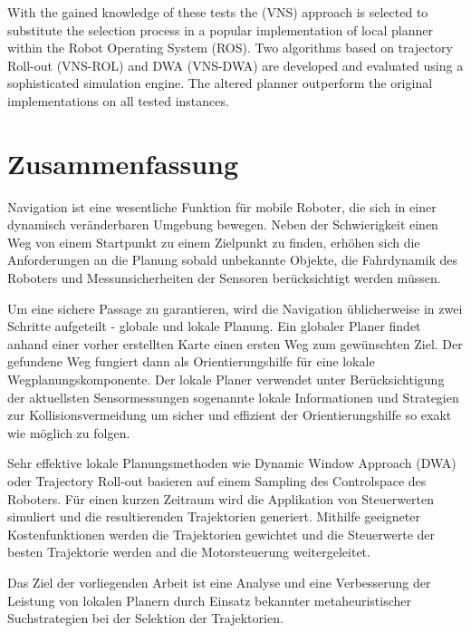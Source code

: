 With the gained knowledge of these tests the (VNS) approach is selected to substitute the selection process in a popular implementation of local planner within the Robot Operating System (ROS). 
Two algorithms based on trajectory Roll-out (VNS-ROL) and DWA (VNS-DWA) are developed and evaluated using a sophisticated simulation engine. 
The altered planner outperform the original implementations on all tested instances.
\vfill
\newpage

\chapter*{Zusammenfassung}
Navigation ist eine wesentliche Funktion f\"ur mobile Roboter, die sich in einer dynamisch ver\"anderbaren Umgebung bewegen. 
Neben der Schwierigkeit einen Weg von einem Startpunkt zu einem Zielpunkt zu finden, erh\"ohen sich die Anforderungen an die Planung sobald unbekannte Objekte, die Fahrdynamik des Roboters und Messunsicherheiten der Sensoren ber\"ucksichtigt werden m\"ussen. 

Um eine sichere Passage zu garantieren, wird die Navigation \"ublicherweise in zwei Schritte aufgeteilt - globale und lokale Planung. 
Ein globaler Planer findet anhand einer vorher erstellten Karte einen ersten Weg zum gew\"unschten Ziel. 
Der gefundene Weg fungiert dann als Orientierungshilfe f\"ur eine lokale Wegplanungskomponente. 
Der lokale Planer verwendet unter Ber\"ucksichtigung der aktuellsten Sensormessungen sogenannte lokale Informationen und Strategien zur Kollisionsvermeidung um sicher und effizient der Orientierungshilfe so exakt wie m\"oglich zu folgen. 

Sehr effektive lokale Planungsmethoden wie Dynamic Window Approach (DWA) oder Trajectory Roll-out basieren auf einem Sampling des Controlspace des Roboters. 
F\"ur einen kurzen Zeitraum wird die Applikation von Steuerwerten simuliert und die resultierenden Trajektorien generiert.  
Mithilfe geeigneter Kostenfunktionen werden die Trajektorien gewichtet und die Steuerwerte der besten Trajektorie werden and die Motorsteuerung weitergeleitet.

Das Ziel der vorliegenden Arbeit ist eine Analyse und eine Verbesserung der Leistung von lokalen Planern durch Einsatz bekannter metaheuristischer Suchstrategien bei der Selektion der Trajektorien.

